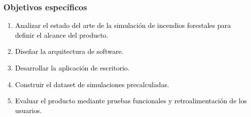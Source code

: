 \subsubsection{Objetivos específicos}
\begin{enumerate}
\item \textcolor{black}{Analizar el estado del arte de la simulación de incendios forestales para definir el alcance del producto.}
\item \textcolor{black}{\textcolor{black}{Diseñar la arquitectura de software.}}
\item \textcolor{black}{\textcolor{black}{Desarrollar la aplicación de escritorio.}}
\item \textcolor{black}{Construir el dataset de simulaciones precalculadas.}
\item \textcolor{black}{Evaluar el producto mediante pruebas funcionales y retroalimentación de los usuarios.}
\end{enumerate}
